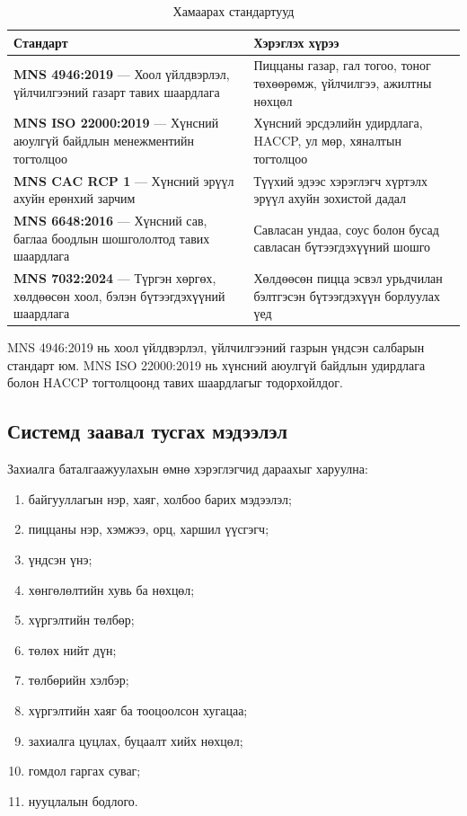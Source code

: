 \begin{table}
    \centering
    \begin{tabular}{p{5cm}p{10cm}}
        \toprule
\textbf{Стандарт} &
\textbf{Хэрэглэх хүрээ} \\
\midrule

\textbf{MNS 4946:2019} --- Хоол үйлдвэрлэл, үйлчилгээний газарт
тавих шаардлага &
Пиццаны газар, гал тогоо, тоног төхөөрөмж, үйлчилгээ, ажилтны нөхцөл \\

\textbf{MNS ISO 22000:2019} --- Хүнсний аюулгүй байдлын менежментийн
тогтолцоо &
Хүнсний эрсдэлийн удирдлага, HACCP, ул мөр, хяналтын тогтолцоо \\

\textbf{MNS CAC RCP 1} --- Хүнсний эрүүл ахуйн ерөнхий зарчим &
Түүхий эдээс хэрэглэгч хүртэлх эрүүл ахуйн зохистой дадал \\

\textbf{MNS 6648:2016} --- Хүнсний сав, баглаа боодлын шошгололтод
тавих шаардлага &
Савласан ундаа, соус болон бусад савласан бүтээгдэхүүний шошго \\

\textbf{MNS 7032:2024} --- Түргэн хөргөх, хөлдөөсөн хоол, бэлэн
бүтээгдэхүүний шаардлага &
Хөлдөөсөн пицца эсвэл урьдчилан бэлтгэсэн бүтээгдэхүүн борлуулах үед \\

\bottomrule
    \end{tabular}
    \caption{Хамаарах стандартууд}
    \label{tab:standards}
\end{table}

MNS 4946:2019 нь хоол үйлдвэрлэл, үйлчилгээний газрын үндсэн салбарын стандарт юм. MNS ISO 22000:2019 нь хүнсний аюулгүй байдлын удирдлага болон HACCP тогтолцоонд тавих шаардлагыг тодорхойлдог.

\subsection{Системд заавал тусгах мэдээлэл}

Захиалга баталгаажуулахын өмнө хэрэглэгчид дараахыг харуулна:

\begin{enumerate}
    \item байгууллагын нэр, хаяг, холбоо барих мэдээлэл;
    \item пиццаны нэр, хэмжээ, орц, харшил үүсгэгч;
    \item үндсэн үнэ;
    \item хөнгөлөлтийн хувь ба нөхцөл;
    \item хүргэлтийн төлбөр;
    \item төлөх нийт дүн;
    \item төлбөрийн хэлбэр;
    \item хүргэлтийн хаяг ба тооцоолсон хугацаа;
    \item захиалга цуцлах, буцаалт хийх нөхцөл;
    \item гомдол гаргах суваг;
    \item нууцлалын бодлого.
\end{enumerate}

